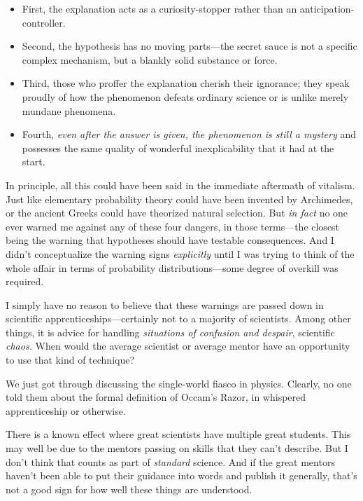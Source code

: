 \begin{itemize}
\item {
 First, the explanation acts as a curiosity-stopper rather than an
anticipation-controller.}

\item {
 Second, the hypothesis has no moving parts---the secret sauce is
not a specific complex mechanism, but a blankly solid substance or
force.}

\item {
 Third, those who proffer the explanation cherish their ignorance;
they speak proudly of how the phenomenon defeats ordinary science or is
unlike merely mundane phenomena.}

\item {
 Fourth, \textit{even after the answer is given, the phenomenon is
still a mystery} and possesses the same quality of wonderful
 inexplicability that it had at the start.}
\end{itemize}

{
 In principle, all this could have been said in the immediate
aftermath of vitalism. Just like elementary probability theory could
have been invented by Archimedes, or the ancient Greeks could have
theorized natural selection. But \textit{in fact} no one ever warned me
against any of these four dangers, in those terms---the closest being
the warning that hypotheses should have testable consequences. And I
didn't conceptualize the warning signs
\textit{explicitly} until I was trying to think of the whole affair in
terms of probability distributions---some degree of overkill was
required.}

{
 I simply have no reason to believe that these warnings are passed
down in scientific apprenticeships---certainly not to a majority of
scientists. Among other things, it is advice for handling
\textit{situations of confusion and despair}, scientific
\textit{chaos.} When would the average scientist or average mentor have
an opportunity to use that kind of technique?}

{
 We just got through discussing the single-world fiasco in physics.
Clearly, no one told them about the formal definition of
Occam's Razor, in whispered apprenticeship or
otherwise.}

{
 There is a known effect where great scientists have multiple great
students. This may well be due to the mentors passing on skills that
they can't describe. But I don't think
that counts as part of \textit{standard} science. And if the great
mentors haven't been able to put their guidance into
words and publish it generally, that's not a good sign
for how well these things are understood.}

